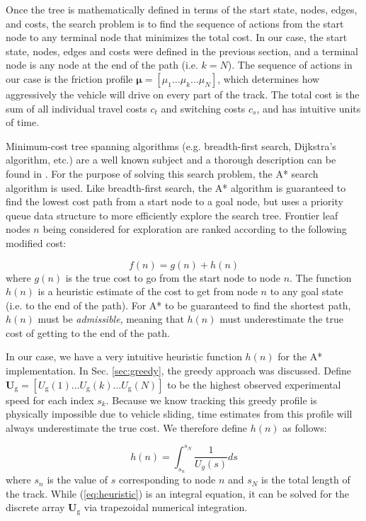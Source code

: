 \documentclass[9pt,shortpaper,twoside,web]{ieeecolor}
\begin{document}
{{{Once the tree is mathematically defined in terms of the start state, nodes, edges, and costs, the search problem is to find the sequence
of actions from the start node to any terminal node that minimizes the total cost. In our case, the start state, nodes, edges
and costs were defined in the previous section, and a terminal node is any node at the end of the path (i.e. $k = N$). The sequence
of actions in our case is the friction profile $\mathbf{\mu} = [\mu_1 \hdots \mu_k \hdots \mu_N]$, which determines how
aggressively the vehicle will drive on every part of the track. The total cost is the sum of all individual travel costs $c_t$ and switching costs
$c_s$, and has intuitive units of time. 

Minimum-cost tree spanning algorithms (e.g. breadth-first search, Dijkstra's algorithm, etc.) are a well known subject and a thorough description
can be found in \cite{aibook}. For the purpose of solving this search problem, the A* search algorithm is used. 
Like breadth-first search, the A* algorithm is guaranteed to find the lowest cost path from a start node to a goal node, 
but uses a priority queue data structure to more efficiently explore the search tree. Frontier leaf nodes $n$ being
considered for exploration are ranked according to the following modified cost:

\begin{equation}
f(n) = g(n) + h(n)
\end{equation}
where $g(n)$ is the true cost to go from the start node to node $n$. The function $h(n)$ is a heuristic estimate of the cost to get from node $n$ to any goal state (i.e. to the end of the
path). For A* to be guaranteed to find the shortest path, $h(n)$ must be \textit{admissible}, meaning that $h(n)$ must underestimate the
true cost of getting to the end of the path. 

In our case, we have a very intuitive heuristic function $h(n)$ for the A* implementation. In Sec. \ref{sec:greedy}, the greedy approach
was discussed. Define $\mathbf{U_\mathrm{g}} = [U_\mathrm{g}(1) \hdots U_\mathrm{g}(k) \hdots U_\mathrm{g}(N)]$ to be the highest observed
experimental speed for each index $s_k$. Because we know tracking this greedy profile is physically impossible due to vehicle sliding, time estimates
from this profile will always underestimate the true cost. We therefore define $h(n)$ as follows:

\begin{equation}
\label{eq:heuristic}
h(n) = \int^{s_N}_{s_n} \frac{1}{U_g(s)} ds
\end{equation}
where $s_n$ is the value of $s$ corresponding to node $n$ and $s_N$ is the total length of the track. While (\ref{eq:heuristic}) is an integral equation, it can be solved for the discrete
array $\mathbf{U}_\mathrm{g}$ via trapezoidal numerical integration.

}}}
\end{document}
